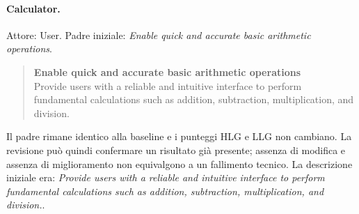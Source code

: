 \paragraph{Calculator.}
Attore: User. Padre iniziale: \emph{Enable quick and accurate basic arithmetic operations}.
\begin{quote}\small
\textbf{Enable quick and accurate basic arithmetic operations}\\
Provide users with a reliable and intuitive interface to perform fundamental calculations such as addition, subtraction, multiplication, and division.
\end{quote}
Il padre rimane identico alla baseline e i punteggi HLG e LLG non cambiano. La revisione pu\`o quindi confermare un risultato gi\`a presente; assenza di modifica e assenza di miglioramento non equivalgono a un fallimento tecnico.
La descrizione iniziale era: \emph{Provide users with a reliable and intuitive interface to perform fundamental calculations such as addition, subtraction, multiplication, and division.}.
